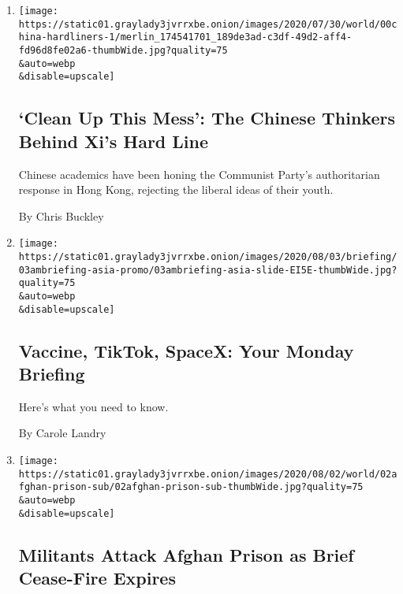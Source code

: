 \begin{enumerate}
\def\labelenumi{\arabic{enumi}.}
\item
  \href{/2020/08/02/world/asia/china-hong-kong-national-security-law.html}{}

  \texttt{[image: https://static01.graylady3jvrrxbe.onion/images/2020/07/30/world/00china-hardliners-1/merlin\_174541701\_189de3ad-c3df-49d2-aff4-fd96d8fe02a6-thumbWide.jpg?quality=75\\\&auto=webp\\\&disable=upscale]}

  \hypertarget{clean-up-this-mess-the-chinese-thinkers-behind-xis-hard-line}{%
  \subsection{`Clean Up This Mess': The Chinese Thinkers Behind Xi's
  Hard
  Line}\label{clean-up-this-mess-the-chinese-thinkers-behind-xis-hard-line}}

  Chinese academics have been honing the Communist Party's authoritarian
  response in Hong Kong, rejecting the liberal ideas of their youth.

  By Chris Buckley
\item
  \href{/2020/08/02/briefing/coronavirus-vaccine-india-us-tiktok-spacex.html}{}

  \texttt{[image: https://static01.graylady3jvrrxbe.onion/images/2020/08/03/briefing/03ambriefing-asia-promo/03ambriefing-asia-slide-EI5E-thumbWide.jpg?quality=75\\\&auto=webp\\\&disable=upscale]}

  \hypertarget{vaccine-tiktok-spacex-your-monday-briefing}{%
  \subsection{Vaccine, TikTok, SpaceX: Your Monday
  Briefing}\label{vaccine-tiktok-spacex-your-monday-briefing}}

  Here's what you need to know.

  By Carole Landry
\item
  \href{/2020/08/02/world/asia/afghan-prison-attack-prisoners.html}{}

  \texttt{[image: https://static01.graylady3jvrrxbe.onion/images/2020/08/02/world/02afghan-prison-sub/02afghan-prison-sub-thumbWide.jpg?quality=75\\\&auto=webp\\\&disable=upscale]}

  \hypertarget{militants-attack-afghan-prison-as-brief-cease-fire-expires}{%
  \subsection{Militants Attack Afghan Prison as Brief Cease-Fire
  Expires}\label{militants-attack-afghan-prison-as-brief-cease-fire-expires}}


\end{enumerate}
